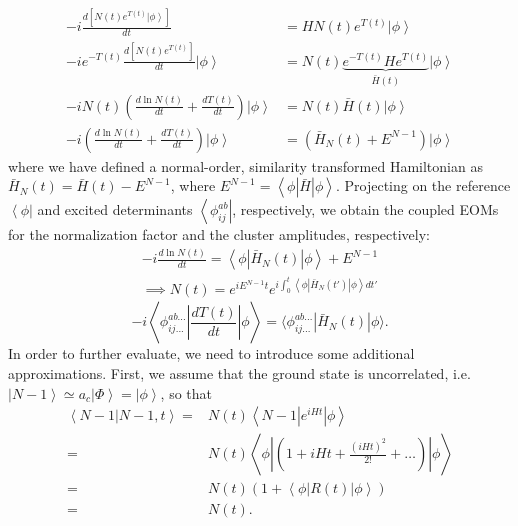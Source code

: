 \begin{align}
    -i \frac{d\left[N(t) e^{T(t)} \left| \phi \right>\right]}{dt} & = H N(t) e^{T(t)} \left| \phi \right> \\
    -i e^{-T(t)}{\frac{d\left[N(t) e^{T(t)} \right]}{dt}} \left| \phi \right>& = N(t) \underbrace{e^{-T(t)} H e^{T(t)}}_{\bar{H}(t)} \left| \phi \right> 
\label{de_1}\\
    -i N(t) \left( \frac{d\ln N(t)}{dt} + \frac{d T(t)}{dt} \right) \left| \phi \right>& = N(t) \bar{H}(t) \left| \phi \right> 
\label{de_2}
\\
    -i \left( \frac{d\ln N(t)}{dt} + \frac{d T(t)}{dt} \right) \left| \phi \right>& = \left( \bar{H}_N(t) + E^{N-1} \right) \left| \phi \right>
\label{de_3}
\end{align}
 where we have defined a normal-order, similarity transformed Hamiltonian as $\bar{H}_N(t) = \bar{H}(t) - E^{N-1}$, where $E^{N-1} = \left< \phi | \bar{H} | \phi \right>$. Projecting on the reference $\left< \phi \right|$ and excited determinants $\left< \phi_{ij}^{ab} \right|$, respectively, we obtain the coupled EOMs for the normalization factor and the cluster amplitudes, respectively:
\begin{align}
\label{eq-dlnndt}
-i \frac{d \ln N(t)}{dt} = \left< \phi \left| \bar{H}_N(t) \right| \phi \right>
+ E^{N-1} \\
\implies N(t) = e^{i E^{N-1} t} e^{i \int_0^t \left< \phi \left| \bar{H}_N(t') \right| \phi \right> dt'}
\label{eq:nt}
\end{align}
\begin{equation}
\label{eq-dtdt}
-i \left< \phi_{ij...}^{ab...} \left| \frac{d T(t)}{dt} \right| \phi \right> =
\langle \phi_{ij...}^{ab...} \left| \bar{H}_N(t) \right| \phi \rangle.
\end{equation}
In order to further evaluate, we need to introduce some additional approximations. First, we assume that the ground state is uncorrelated, i.e.
$\left| N-1 \right> \simeq a_c \left| \Phi \right> = \left| \phi \right>$,
so that
\begin{equation}
\begin{split}
\left<N-1\right| \left. N-1, t \right> =&
N(t) \left<N-1\left| e^{iHt}\right| \phi \right> \\
=&N(t) \left< \phi \left| \left( 1+ iHt + \frac{(iHt)^2}{2!} + \ldots \right) \right| \phi \right> \\
=&N(t) \left( 1+ \left< \phi \left| R(t) \right| \phi \right> \right) \\
=&N(t).
\end{split}
\end{equation}
